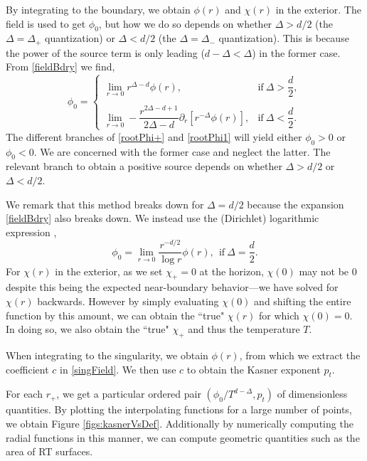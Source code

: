 \documentclass[12pt,a4paper]{article}
\begin{document}
\begin{appendices}
By integrating to the boundary, we obtain $\phi(r)$ and $\chi(r)$ in the exterior. The field is used to get $\phi_0$, but how we do so depends on whether $\Delta > d/2$ (the $\Delta = \Delta_+$ quantization) or $\Delta < d/2$ (the $\Delta = \Delta_-$ quantization). This is because the power of the source term is only leading ($d - \Delta < \Delta$) in the former case. From \eqref{fieldBdry} we find,
\begin{equation}
\phi_0 = \begin{cases}
\displaystyle\lim_{r \to 0} r^{\Delta - d}\phi(r),&\text{if}\ \Delta > \dfrac{d}{2},\\\\[-3ex]
\displaystyle\lim_{r \to 0} -\dfrac{r^{2\Delta - d + 1}}{2\Delta - d}\partial_r \left[r^{-\Delta}\phi(r)\right],&\text{if}\ \Delta < \dfrac{d}{2}.
\end{cases}
\end{equation}
The different branches of \eqref{rootPhi+} and \eqref{rootPhi1} will yield either $\phi_0 > 0$ or $\phi_0 < 0$. We are concerned with the former case and neglect the latter. The relevant branch to obtain a positive source depends on whether $\Delta > d/2$ or $\Delta < d/2$.

We remark that this method breaks down for $\Delta = d/2$ because the expansion \eqref{fieldBdry} also breaks down. We instead use the (Dirichlet) logarithmic expression \cite{Minces:1999eg},
\begin{equation}
\phi_0 = \lim_{r \to 0} \frac{r^{-d/2}}{\log r} \phi(r),\ \ \text{if}\ \Delta = \frac{d}{2}.
\end{equation}
For $\chi(r)$ in the exterior, as we set $\chi_+ = 0$ at the horizon, $\chi(0)$ may not be $0$ despite this being the expected near-boundary behavior---we have solved for $\chi(r)$ backwards. However by simply evaluating $\chi(0)$ and shifting the entire function by this amount, we can obtain the ``true" $\chi(r)$ for which $\chi(0) = 0$. In doing so, we also obtain the ``true" $\chi_+$ and thus the temperature $T$.

When integrating to the singularity, we obtain $\phi(r)$, from which we extract the coefficient $c$ in \eqref{singField}. We then use $c$ to obtain the Kasner exponent $p_t$.

For each $r_+$, we get a particular ordered pair $(\phi_0/T^{d-\Delta},p_t)$ of dimensionless quantities. By plotting the interpolating functions for a large number of points, we obtain Figure \ref{figs:kasnerVsDef}. Additionally by numerically computing the radial functions in this manner, we can compute geometric quantities such as the area of RT surfaces.


\end{appendices}
\end{document}
